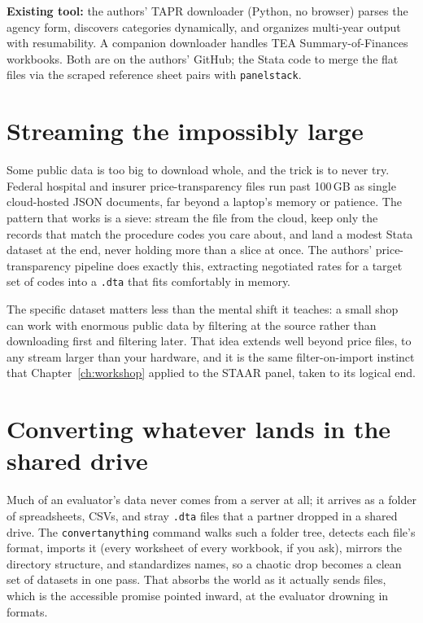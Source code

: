\documentclass[
    a4paper,
    fontsize=10pt,
    twoside=true,
    numbers=noenddot,
]{kaobook}
\begin{document}
\begin{kaobox}[frametitle=Package Integration: \texttt{TEA-TAPR-download}]
\textbf{Existing tool:} the authors' TAPR downloader (Python, no browser) parses the agency form, discovers categories dynamically, and organizes multi-year output with resumability. A companion downloader handles TEA Summary-of-Finances workbooks. Both are on the authors' GitHub; the Stata code to merge the flat files via the scraped reference sheet pairs with \texttt{panelstack}.
\end{kaobox}

\section{Streaming the impossibly large}
Some public data is too big to download whole, and the trick is to never try. Federal hospital and insurer price-transparency files run past 100\,GB as single cloud-hosted JSON documents, far beyond a laptop's memory or patience. The pattern that works is a sieve: stream the file from the cloud, keep only the records that match the procedure codes you care about, and land a modest Stata dataset at the end, never holding more than a slice at once. The authors' price-transparency pipeline does exactly this, extracting negotiated rates for a target set of codes into a \texttt{.dta} that fits comfortably in memory.

The specific dataset matters less than the mental shift it teaches: a small shop can work with enormous public data by filtering at the source rather than downloading first and filtering later. That idea extends well beyond price files, to any stream larger than your hardware, and it is the same filter-on-import instinct that Chapter~\ref{ch:workshop} applied to the STAAR panel, taken to its logical end.

\section{Converting whatever lands in the shared drive}
Much of an evaluator's data never comes from a server at all; it arrives as a folder of spreadsheets, CSVs, and stray \texttt{.dta} files that a partner dropped in a shared drive. The \texttt{convertanything} command walks such a folder tree, detects each file's format, imports it (every worksheet of every workbook, if you ask), mirrors the directory structure, and standardizes names, so a chaotic drop becomes a clean set of datasets in one pass. That absorbs the world as it actually sends files, which is the accessible promise pointed inward, at the evaluator drowning in formats.
\end{document}
